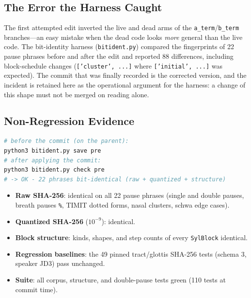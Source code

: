 \documentclass[11pt,a4paper]{article}
\newcommand{\code}[1]{\texttt{#1}}
\begin{document}
\subsection{The Error the Harness Caught}

The first attempted edit inverted the live and dead arms of the
\code{a\_term}/\code{b\_term} branches---an easy mistake when the
dead code looks \emph{more} general than the live code. The
bit-identity harness (\code{bitident.py}) compared the fingerprints
of 22 pause phrases before and after the edit and reported 88
differences, including block-schedule changes (\code{['cluster',
...]} where \code{['initial', ...]} was expected). The commit that
was finally recorded is the corrected version, and the incident is
retained here as the operational argument for the harness: a change
of this shape must not be merged on reading alone.

\subsection{Non-Regression Evidence}

\begin{lstlisting}[language=bash, caption={Bit-identity protocol around commit 2.}]
# before the commit (on the parent):
python3 bitident.py save pre
# after applying the commit:
python3 bitident.py check pre
# -> OK - 22 phrases bit-identical (raw + quantized + structure)
\end{lstlisting}

\begin{itemize}[leftmargin=1.4em, itemsep=0.15em]
  \item \textbf{Raw SHA-256}: identical on all 22 pause phrases
        (single and double pauses, breath pauses \code{\%}, TIMIT
        dotted forms, nasal clusters, schwa edge cases).
  \item \textbf{Quantized SHA-256} ($10^{-9}$): identical.
  \item \textbf{Block structure}: kinds, shapes, and step counts of
        every \code{SylBlock} identical.
  \item \textbf{Regression baselines}: the 49 pinned tract/glottis
        SHA-256 tests (schema 3, speaker JD3) pass unchanged.
  \item \textbf{Suite}: all corpus, structure, and double-pause tests
        green (110 tests at commit time).
\end{itemize}

\end{document}
